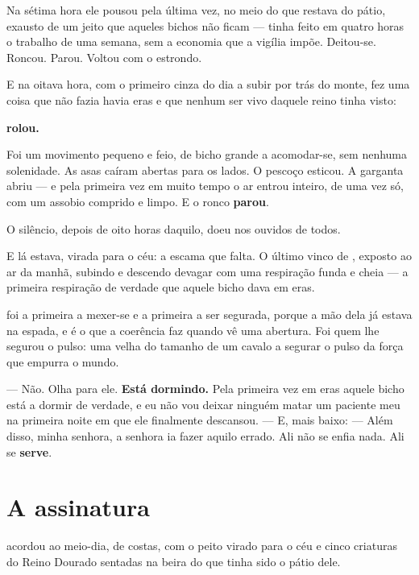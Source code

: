\documentclass[livro.tex]{subfiles}
\begin{document}
\medskip

Na sétima hora ele pousou pela última vez, no meio do que restava do pátio, exausto de um jeito
que aqueles bichos não ficam --- tinha feito em quatro horas o trabalho de uma semana, sem a
economia que a vigília impõe. Deitou-se. Roncou. Parou. Voltou com o estrondo.

E na oitava hora, com o primeiro cinza do dia a subir por trás do monte, \Ven fez uma coisa que
não fazia havia eras e que nenhum ser vivo daquele reino tinha visto:

\textbf{rolou.}

Foi um movimento pequeno e feio, de bicho grande a acomodar-se, sem nenhuma solenidade. As asas
caíram abertas para os lados. O pescoço esticou. A garganta abriu --- e pela primeira vez em
muito tempo o ar entrou inteiro, de uma vez só, com um assobio comprido e limpo. E o ronco
\textbf{parou}.

O silêncio, depois de oito horas daquilo, doeu nos ouvidos de todos.

\medskip

E lá estava, virada para o céu: a escama que falta. O último vinco de \Ven , exposto ao ar da
manhã, subindo e descendo devagar com uma respiração funda e cheia --- a primeira respiração de
verdade que aquele bicho dava em eras.

\Yas foi a primeira a mexer-se e a primeira a ser segurada, porque a mão dela já estava na espada,
e é o que a coerência faz quando vê uma abertura. Foi \Qui quem lhe segurou o pulso: uma velha do
tamanho de um cavalo a segurar o pulso da força que empurra o mundo.

--- Não. Olha para ele. \textbf{Está dormindo.} Pela primeira vez em eras aquele bicho está a
dormir de verdade, e eu não vou deixar ninguém matar um paciente meu na primeira noite em que ele
finalmente descansou. --- E, mais baixo: --- Além disso, minha senhora, a senhora ia fazer aquilo
errado. Ali não se enfia nada. Ali se \textbf{serve}.

\chapter{A assinatura}

\Ven acordou ao meio-dia, de costas, com o peito virado para o céu e cinco criaturas do Reino
Dourado sentadas na beira do que tinha sido o pátio dele.
\end{document}
